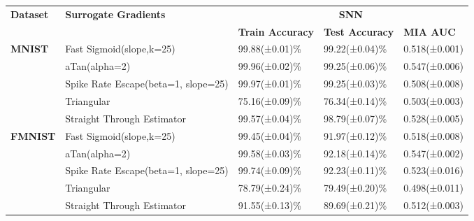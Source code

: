 \begin{table*}[htbp]
\centering
\scriptsize %
\renewcommand{\arraystretch}{0.9} %
\setlength{\tabcolsep}{4pt} %
\begin{tabular}{p{2cm} p{4cm} p{1.5cm} p{1.5cm} p{1.5cm}}
\toprule
\textbf{Dataset} & \textbf{Surrogate Gradients} & \multicolumn{3}{c}{\textbf{SNN}} \\
\cmidrule(lr){3-5}
 &  & \textbf{Train Accuracy} & \textbf{Test Accuracy} & \textbf{MIA AUC} \\
\midrule
\textbf{MNIST} & Fast Sigmoid(slope,k=25) & 99.88(±0.01)\% & 99.22(±0.04)\% & 0.518(±0.001) \\
 & aTan(alpha=2) & 99.96(±0.02)\% & 99.25(±0.06)\% &  0.547(±0.006)  \\
 & Spike Rate Escape(beta=1, slope=25) & 99.97(±0.01)\% & 99.25(±0.03)\% & 0.508(±0.008) \\
 & Triangular & 75.16(±0.09)\% & 76.34(±0.14)\% & 0.503(±0.003) \\
 & Straight Through Estimator & 99.57(±0.04)\% & 98.79(±0.07)\% & 0.528(±0.005) \\
\midrule
\textbf{FMNIST} & Fast Sigmoid(slope,k=25) & 99.45(±0.04)\% & 91.97(±0.12)\% & 0.518(±0.008) \\
 & aTan(alpha=2) & 99.58(±0.03)\% & 92.18(±0.14)\% & 0.547(±0.002) \\
 & Spike Rate Escape(beta=1, slope=25) & 99.74(±0.09)\% & 92.23(±0.11)\% & 0.523(±0.016) \\
 & Triangular & 78.79(±0.24)\% & 79.49(±0.20)\% & 0.498(±0.011) \\
 & Straight Through Estimator & 91.55(±0.13)\% & 89.69(±0.21)\% & 0.512(±0.003) \\

\end{tabular}
\end{table*}
